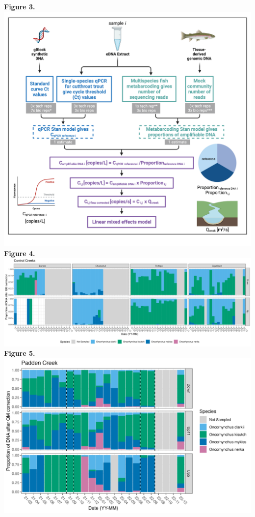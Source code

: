 \documentclass[
]{article}
\begin{document}
\textbf{Figure 3.} \includegraphics{../Output/Figures/NGN_Fig3.png}
\newpage \textbf{Figure 4.}
\includegraphics{../Output/Figures/proportions_after_qm_nopadden.png}
\newpage \textbf{Figure 5.}
\includegraphics{../Output/Figures/proportions_after_qm_padden.png}
\end{document}
